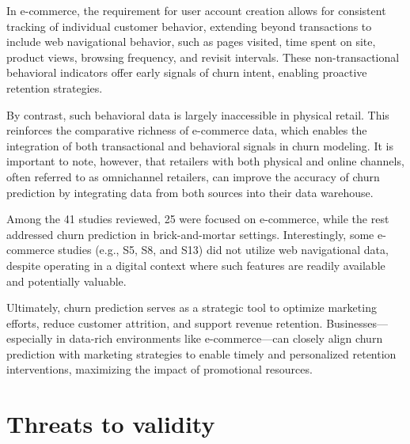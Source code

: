 \documentclass[preprint,12pt]{elsarticle}
\newcommand{\DD}[2]{\textcolor{blue}{#1}[\textcolor{red}{#2}]}
\begin{document}
In e-commerce, the requirement for user account creation allows for consistent tracking of individual customer behavior, extending beyond transactions to include web navigational behavior, such as pages visited, time spent on site, product views, browsing frequency, and revisit intervals. These non-transactional behavioral indicators offer early signals of churn intent, enabling proactive retention strategies.

By contrast, such behavioral data is largely inaccessible in physical retail. This reinforces the comparative richness of e-commerce data, which enables the integration of both transactional and behavioral signals in churn modeling. 
It is important to note, however, that retailers with both physical and online channels, often referred to as omnichannel retailers, can improve the accuracy of churn prediction by integrating data from both sources into their data warehouse. 

Among the 41 studies reviewed, 25 were focused on e-commerce, while the rest addressed churn prediction in brick-and-mortar settings. Interestingly, some e-commerce studies (e.g., S5, S8, and S13) did not utilize web navigational data, despite operating in a digital context where such features are readily available and potentially valuable.

Ultimately, churn prediction serves as a strategic tool to optimize marketing efforts, reduce customer attrition, and support revenue retention. Businesses---especially in data-rich environments like e-commerce---can closely align churn prediction with marketing strategies to enable timely and personalized retention interventions, maximizing the impact of promotional resources.

\section{Threats to validity}
\label{sec:threats-to-validity}


\end{document}
